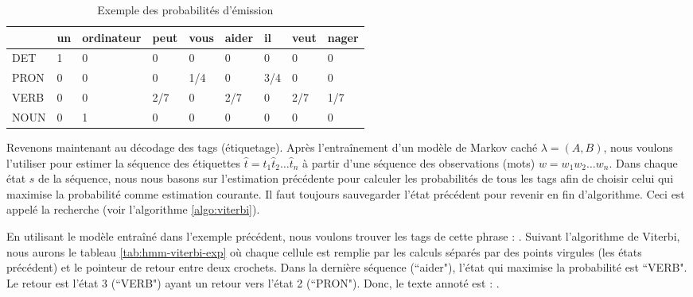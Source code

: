 \documentclass{KodeBook}
\begin{document}
\begin{table}[ht]
	\centering
\begin{tabular}{lllllllll}
	\cline{2-9}\noalign{\vskip\doublerulesep
		\vskip-\arrayrulewidth}\cline{2-9}
	     & un & ordinateur & peut & vous & aider & il & veut & nager \\
	\hline
	DET  &  1 &  0         &  0   &   0  &  0    & 0  & 0    & 0 \\
	PRON &  0 &  0         &  0   & 1/4  &  0    &3/4 & 0    & 0 \\
	VERB &  0 &  0         & 2/7  &   0  &  2/7  & 0  & 2/7  & 1/7 \\
	NOUN &  0 &  1         &  0   &   0  &  0    & 0  & 0    & 0 \\
	\hline\hline
\end{tabular}
\caption[Exemple des probabilités d'émission]{Exemple des probabilités d'émission \label{tab:hmm-emission}}
\end{table}

Revenons maintenant au décodage des tags (étiquetage). 
Après l'entraînement d'un modèle de Markov caché $\lambda = (A, B)$, nous voulons l'utiliser pour estimer la séquence des étiquettes $\hat{t} = \hat{t}_1 \hat{t}_2 \ldots \hat{t}_n$ à partir d'une séquence des observations (mots) $w = w_1 w_2 \ldots w_n$. 
Dans chaque état $s$ de la séquence, nous nous basons sur l'estimation précédente pour calculer les probabilités de tous les tags afin de choisir celui qui maximise la probabilité comme estimation courante. 
Il faut toujours sauvegarder l'état précédent pour revenir en fin d'algorithme. 
Ceci est appelé la recherche  (voir l'algorithme \ref{algo:viterbi}).

En utilisant le modèle entraîné dans l'exemple précédent, nous voulons trouver les tags de cette phrase : . 
Suivant l'algorithme de Viterbi, nous aurons le tableau \ref{tab:hmm-viterbi-exp} où chaque cellule est remplie par les calculs séparés par des points virgules (les états précédent) et le pointeur de retour entre deux crochets. 
Dans la dernière séquence (``aider"), l'état qui maximise la probabilité est ``VERB". 
Le retour est l'état 3 (``VERB") ayant un retour vers l'état 2 (``PRON"). 
Donc, le texte annoté est : . 
\end{document}
